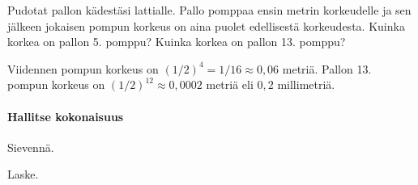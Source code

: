 \begin{tehtavasivu}
    \begin{tehtava}
        Pudotat pallon kädestäsi lattialle. Pallo pomppaa ensin metrin korkeudelle ja sen jälkeen jokaisen pompun korkeus on aina puolet edellisestä korkeudesta. Kuinka korkea on pallon 5. pomppu? Kuinka korkea on pallon 13. pomppu?     
        \begin{vastaus}
        Viidennen pompun korkeus on $(1/2)^4=1/16 \approx 0,06$ metriä. Pallon 13. pompun korkeus on $(1/2)^{12} \approx 0{,}0002$ metriä eli $0,2$ millimetriä.
        \end{vastaus}
\end{tehtava}


\paragraph*{Hallitse kokonaisuus}

\begin{tehtava}
  		Sievennä.
        \begin{alakohdatrivi}
 		\end{alakohdatrivi}
        \begin{vastaus}
        \begin{alakohdatrivi}
        \end{alakohdatrivi}
        \end{vastaus}
\end{tehtava}

\begin{tehtava}
  		Laske.
        \begin{alakohdatrivi}
 		\end{alakohdatrivi}
        \begin{vastaus}
        \begin{alakohdatrivi}
        \end{alakohdatrivi}
        \end{vastaus}
\end{tehtava}


\end{tehtavasivu}
